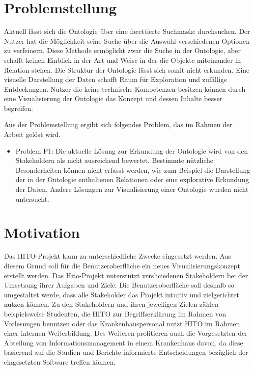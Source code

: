 \section{Problemstellung}\label{sec:problemstellung}

Aktuell lässt sich die Ontologie über eine facettierte Suchmaske durchsuchen. 
Der Nutzer hat die Möglichkeit seine Suche über die Auswahl verschiedenen Optionen zu verfeinern.
Diese Methode ermöglicht zwar die Suche in der Ontologie, aber schafft keinen Einblick in der Art und Weise in der die Objekte miteinander in Relation stehen.
Die Struktur der Ontologie lässt sich somit nicht erkunden.
Eine visuelle Darstellung der Daten schafft Raum für Exploration und zufällige Entdeckungen. 
Nutzer die keine technische Kompetenzen besitzen können durch eine Visualisierung der Ontologie das Konzept und dessen Inhalte besser begreifen. \citep[vgl.]{linkeddatavisualization} \newline
\newline

Aus der Problemstellung ergibt sich folgendes Problem, das im Rahmen der Arbeit gelöst wird.

\begin{itemize}
\item Problem P1: Die aktuelle Lösung zur Erkundung der Ontologie wird von den Stakeholdern als nicht ausreichend bewertet.
Bestimmte nützliche Besonderheiten können nicht erfasst werden, wie zum Beispiel die Darstellung der in der Ontologie enthaltenen Relationen oder eine explorative Erkundung der Daten. 
Andere Lösungen zur Visualisierung einer Ontologie wurden nicht untersucht.
\end{itemize}

\section{Motivation}\label{sec:motivation}

Das HITO-Projekt kann zu unterschiedliche Zwecke eingesetzt werden. 
Aus diesem Grund soll für die Benutzeroberfläche ein neues Visualisierungskonzept erstellt werden. 
Das Hito-Projekt unterstützt vershciedenen Stakeholdern bei der Umsetzung ihrer Aufgaben und Ziele.
Die Benutzeroberfläche soll deshalb so umgestaltet werde, dass alle Stakeholder das Projekt intuitiv und zielgerichtet nutzen können.
Zu den Stakeholdern und ihren jeweiligen Zielen zählen beispielsweise Studenten, die HITO zur Begriffserklärung im Rahmen von Vorlesungen benutzen oder das Krankenhauspersonal nutzt HITO im Rahmen einer internen Weiterbildung. 
Des Weiteren profitieren auch die Vorgesetzten der Abteilung von Informationsmanagement in einem Krankenhaus davon, da diese basierend auf die Studien und Berichte informierte Entscheidungen bezüglich der eingesetzten Software treffen können. 


